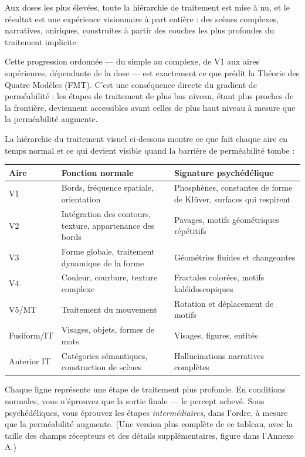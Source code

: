 \documentclass[11pt, twoside, openright]{book}
\begin{document}
Aux doses les plus élevées, toute la hiérarchie de traitement est mise à nu, et le résultat est une expérience visionnaire à part entière : des scènes complexes, narratives, oniriques, construites à partir des couches les plus profondes du traitement implicite.

Cette progression ordonnée --- du simple au complexe, de V1 aux aires supérieures, dépendante de la dose --- est exactement ce que prédit la Théorie des Quatre Modèles (FMT). C'est une conséquence directe du gradient de perméabilité : les étapes de traitement de plus bas niveau, étant plus proches de la frontière, deviennent accessibles avant celles de plus haut niveau à mesure que la perméabilité augmente.

La hiérarchie du traitement visuel ci-dessous montre ce que fait chaque aire en temps normal et ce qui devient visible quand la barrière de perméabilité tombe :


\small
\begin{xltabular}{\linewidth}{X X X}
\toprule
\textbf{Aire} & \textbf{Fonction normale} & \textbf{Signature psychédélique} \\
\midrule\endhead
V1 & Bords, fréquence spatiale, orientation & Phosphènes, constantes de forme de Klüver, surfaces qui respirent \\[4pt]
V2 & Intégration des contours, texture, appartenance des bords & Pavages, motifs géométriques répétitifs \\[4pt]
V3 & Forme globale, traitement dynamique de la forme & Géométries fluides et changeantes \\[4pt]
V4 & Couleur, courbure, texture complexe & Fractales colorées, motifs kaléidoscopiques \\[4pt]
V5/\allowbreak{}MT & Traitement du mouvement & Rotation et déplacement de motifs \\[4pt]
Fusiform/\allowbreak{}IT & Visages, objets, formes de mots & Visages, figures, entités \\[4pt]
Anterior IT & Catégories sémantiques, construction de scènes & Hallucinations narratives complètes \\[4pt]
\bottomrule
\end{xltabular}
\normalsize


Chaque ligne représente une étape de traitement plus profonde. En conditions normales, vous n'éprouvez que la sortie finale --- le percept achevé. Sous psychédéliques, vous éprouvez les étapes \textit{intermédiaires}, dans l'ordre, à mesure que la perméabilité augmente. (Une version plus complète de ce tableau, avec la taille des champs récepteurs et des détails supplémentaires, figure dans l'Annexe A.)
\end{document}
